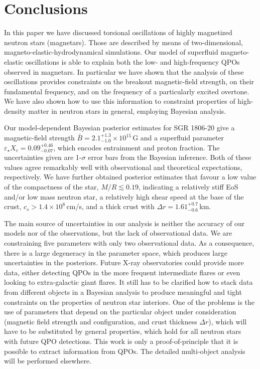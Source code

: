 \documentclass[useAMS,usenatbib]{mnras}
\begin{document}
%
\section{Conclusions}\label{sec_conclusion}
%

In this paper we have discussed torsional oscillations of highly magnetized 
neutron stars (magnetars). Those are described by means of two-dimensional, 
magneto-elastic-hydrodynamical simulations. Our model of superfluid 
magneto-elastic oscillations is able to explain both the low- and high-frequency 
QPOs observed in magnetars. In particular we have shown that the analysis of 
these oscillations provides constraints on the breakout magnetic-field 
strength, on their fundamental frequency, and on the frequency of a particularly 
excited overtone. We have also shown how to use this information to constraint  
properties of high-density matter in neutron stars in general, employing 
Bayesian analysis. 

Our model-dependent Bayesian posterior estimates for SGR 1806-20 give a 
magnetic-field strength $\bar B= 2.1^{+1.3}_{-1.0}\times10^{15}\,$G and 
a 
superfluid parameter $\varepsilon_\star X_c=0.09^{+0.46}_{-0.07}$, which 
encodes entrainment and proton fraction. The uncertainties given are 1-$\sigma$ 
error bars from the Bayesian inference. Both of these values agree remarkably 
well with observational and theoretical expectations, respectively. We have 
further 
obtained posterior estimates that favour a low value of the compactness of the 
star, $M/R\lesssim0.19$, indicating a relatively stiff EoS and/or low mass 
neutron star, a relatively high shear speed at the base of the crust,  
$c_s>1.4\times10^8\,$cm/s, and a thick crust with $\Delta 
r=1.61^{+0.7}_{-0.6}\,$km.

The main source of uncertainties in our analysis is neither the accuracy of our 
models
nor of the observations, but the lack of observational data. We are 
constraining five parameters
with only two observational data. As a consequence, there is a large degeneracy 
in the parameter
space, which produces large uncertainties in the posteriors. Future X-ray 
observatories could provide more data, either detecting QPOs in the more 
frequent intermediate flares or even looking to extra-galactic giant flares. It 
still has to be clarified how to stack data from different objects in a 
Bayesian analysis to produce meaningful and tight constraints on the properties 
of neutron star interiors. One of the problems is the use of parameters that 
depend on the particular object under consideration (magnetic field strength 
and configuration, and crust thickness $\Delta r$), which will
have to be substituted by general properties, which hold for all 
neutron stars with future QPO detections. This work is only a 
proof-of-principle that it is possible
to extract information from QPOs. The detailed multi-object analysis will be 
performed elsewhere.
\end{document}
